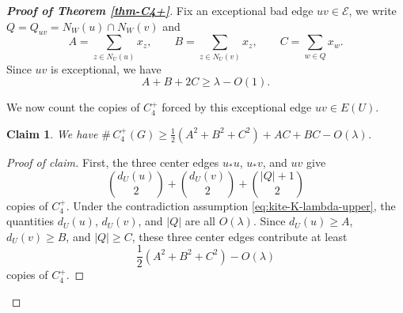 \documentclass[11pt,a4paper]{article}
\newtheorem{claim}[theorem]{Claim}
\theoremstyle{definition}
\theoremstyle{plain}
\renewcommand{\ge}{\geqslant}
\begin{document}
\begin{proof}[{\bf Proof of Theorem \ref{thm-C4+}}]
 Fix an exceptional bad
edge \(uv\in\mathcal E\), we write 
$ Q=Q_{uv}=N_W(u)\cap N_W(v)$ 
and 
\[
        A=\sum_{z\in N_U(u)}x_z,
        \qquad
        B=\sum_{z\in N_U(v)}x_z,
        \qquad
        C=\sum_{w\in Q}x_w.
\]
Since \(uv\) is exceptional, we have 
\begin{equation}\label{eq:kite-exceptional-ABC}
        A+B+2C\ge \lambda-O(1).
\end{equation}

We now count the copies of \(C_4^+\) forced by this exceptional edge $uv\in E(U)$.  

\begin{claim} \label{cl:lower-copies}
    We have $\texttt{\#}\, C_4^+(G) \ge
        \frac12(A^2+B^2+C^2)+AC+BC-O(\lambda) $. 
\end{claim}


\begin{proof}[Proof of claim]
First,
the three center edges \(u_*u\), \(u_*v\), and \(uv\) give
\[
        {d_U(u)\choose2}
        +
        {d_U(v)\choose2}
        +
        {|Q|+1\choose2}
\]
copies of $C_4^+$.  Under the contradiction assumption \eqref{eq:kite-K-lambda-upper},
the quantities \(d_U(u)\), \(d_U(v)\), and \(|Q| \) are all \(O(\lambda)\).
Since \(d_U(u)\ge A\), \(d_U(v)\ge B\), and \(|Q|\ge C\), these three center
edges contribute at least
\begin{equation}\label{eq:kite-three-centers}
        \frac12(A^2+B^2+C^2)-O(\lambda)
\end{equation}
copies of \(C_4^+\).


\end{proof}
\end{proof}
\end{document}
